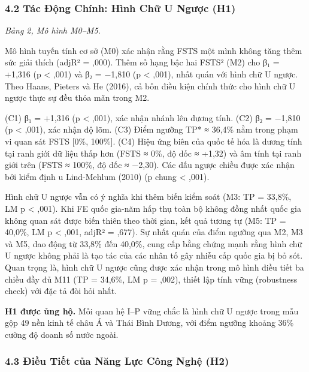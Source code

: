 \documentclass[12pt,a4paper]{article}
\begin{document}
\hypertarget{42-tuxe1c-ux111ux1ed9ng-chuxednh-huxecnh-chux1eef-u-ngux1b0ux1ee3c-h1}{%
\subsubsection{4.2 Tác Động Chính: Hình Chữ U Ngược
(H1)}\label{42-tuxe1c-ux111ux1ed9ng-chuxednh-huxecnh-chux1eef-u-ngux1b0ux1ee3c-h1}}

\emph{Bảng 2, Mô hình M0--M5.}

Mô hình tuyến tính cơ sở (M0) xác nhận rằng FSTS một mình không tăng
thêm sức giải thích (adjR² = ,000). Thêm số hạng bậc hai FSTS² (M2) cho
β₁ = +1,316 (p \textless{} ,001) và β₂ = −1,810 (p \textless{} ,001),
nhất quán với hình chữ U ngược. Theo Haans, Pieters và He (2016), cả bốn
điều kiện chính thức cho hình chữ U ngược thực sự đều thỏa mãn trong M2.

(C1) β₁ = +1,316 (p \textless{} ,001), xác nhận nhánh lên dương tính.
(C2) β₂ = −1,810 (p \textless{} ,001), xác nhận độ lõm. (C3) Điểm ngưỡng
TP* ≈ 36,4\% nằm trong phạm vi quan sát FSTS {[}0\%, 100\%{]}. (C4) Hiệu
ứng biên của quốc tế hóa là dương tính tại ranh giới dữ liệu thấp hơn
(FSTS ≈ 0\%, độ dốc ≈ +1,32) và âm tính tại ranh giới trên (FSTS ≈
100\%, độ dốc ≈ −2,30). Các dấu ngược chiều được xác nhận bởi kiểm định
u Lind-Mehlum (2010) (p chung \textless{} ,001).

Hình chữ U ngược vẫn có ý nghĩa khi thêm biến kiểm soát (M3: TP =
33,8\%, LM p \textless{} ,001). Khi FE quốc gia-năm hấp thụ toàn bộ
không đồng nhất quốc gia không quan sát được biến thiên theo thời gian,
kết quả tương tự (M5: TP = 40,0\%, LM p \textless{} ,001, adjR² = ,677).
Sự nhất quán của điểm ngưỡng qua M2, M3 và M5, dao động từ 33,8\% đến
40,0\%, cung cấp bằng chứng mạnh rằng hình chữ U ngược không phải là tạo
tác của các nhân tố gây nhiễu cấp quốc gia bị bỏ sót. Quan trọng là,
hình chữ U ngược cũng được xác nhận trong mô hình điều tiết ba chiều đầy
đủ M11 (TP = 34,6\%, LM p = ,002), thiết lập tính vững (robustness
check) với đặc tả đòi hỏi nhất.

\textbf{H1 được ủng hộ.} Mối quan hệ I--P vững chắc là hình chữ U ngược
trong mẫu gộp 49 nền kinh tế châu Á và Thái Bình Dương, với điểm ngưỡng
khoảng 36\% cường độ doanh số nước ngoài.

\hypertarget{43-ux111iux1ec1u-tiux1ebft-cux1ee7a-nux103ng-lux1ef1c-cuxf4ng-nghux1ec7-h2}{%
\subsubsection{4.3 Điều Tiết của Năng Lực Công Nghệ
(H2)}\label{43-ux111iux1ec1u-tiux1ebft-cux1ee7a-nux103ng-lux1ef1c-cuxf4ng-nghux1ec7-h2}}
\end{document}
